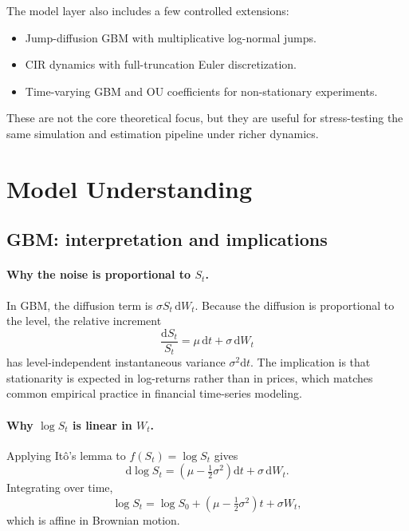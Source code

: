 \documentclass[11pt]{article}
\newcommand{\dd}{\mathrm{d}}
\begin{document}
The model layer also includes a few controlled extensions:
\begin{itemize}[leftmargin=1.2em]
  \item Jump-diffusion GBM with multiplicative log-normal jumps.
  \item CIR dynamics with full-truncation Euler discretization.
  \item Time-varying GBM and OU coefficients for non-stationary experiments.
\end{itemize}

These are not the core theoretical focus, but they are useful for stress-testing the same simulation and estimation pipeline under richer dynamics.

\section{Model Understanding}

\subsection{GBM: interpretation and implications}

\paragraph{Why the noise is proportional to $S_t$.}
In GBM, the diffusion term is $\sigma S_t\,\dd W_t$. Because the diffusion is proportional to the level, the relative increment
\begin{equation}
  \frac{\dd S_t}{S_t} = \mu\,\dd t + \sigma\,\dd W_t
\end{equation}
has level-independent instantaneous variance $\sigma^2\dd t$. The implication is that stationarity is expected in log-returns rather than in prices, which matches common empirical practice in financial time-series modeling.

\paragraph{Why $\log S_t$ is linear in $W_t$.}
Applying It\^o's lemma to $f(S_t)=\log S_t$ gives
\begin{equation}
  \dd \log S_t = \left(\mu - \tfrac{1}{2}\sigma^2\right)\dd t + \sigma\,\dd W_t.
\end{equation}
Integrating over time,
\begin{equation}
  \log S_t = \log S_0 + \left(\mu - \tfrac{1}{2}\sigma^2\right)t + \sigma W_t,
\end{equation}
which is affine in Brownian motion.
\end{document}
